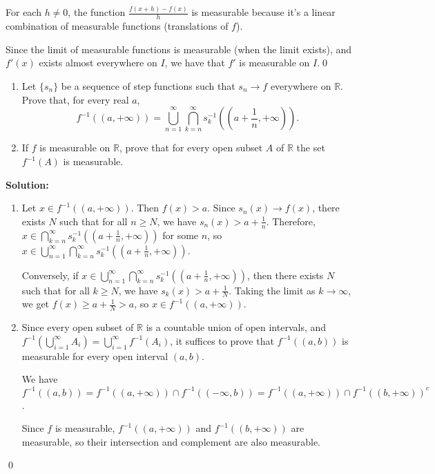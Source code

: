 For each $h \neq 0$, the function $\frac{f(x + h) - f(x)}{h}$ is measurable because it's a linear combination of measurable functions (translations of $f$).

Since the limit of measurable functions is measurable (when the limit exists), and $f'(x)$ exists almost everywhere on $I$, we have that $f'$ is measurable on $I$.\qed


\begin{problembox}
\begin{enumerate}[label=(\alph*)]
    \item Let $\{s_n\}$ be a sequence of step functions such that $s_n \to f$ everywhere on $\mathbb{R}$. Prove that, for every real $a$,
    \[f^{-1}((a, +\infty)) = \bigcup_{n=1}^\infty \bigcap_{k=n}^\infty s_k^{-1} \left( \left( a + \frac{1}{n}, +\infty \right) \right).\]
    \item If $f$ is measurable on $\mathbb{R}$, prove that for every open subset $A$ of $\mathbb{R}$ the set $f^{-1}(A)$ is measurable.
\end{enumerate}
\end{problembox}

\noindent\textbf{Solution:}
\begin{enumerate}[label=(\alph*)]
    \item Let $x \in f^{-1}((a, +\infty))$. Then $f(x) > a$. Since $s_n(x) \to f(x)$, there exists $N$ such that for all $n \geq N$, we have $s_n(x) > a + \frac{1}{n}$. Therefore, $x \in \bigcap_{k=n}^\infty s_k^{-1}((a + \frac{1}{n}, +\infty))$ for some $n$, so $x \in \bigcup_{n=1}^\infty \bigcap_{k=n}^\infty s_k^{-1}((a + \frac{1}{n}, +\infty))$.
    
    Conversely, if $x \in \bigcup_{n=1}^\infty \bigcap_{k=n}^\infty s_k^{-1}((a + \frac{1}{n}, +\infty))$, then there exists $N$ such that for all $k \geq N$, we have $s_k(x) > a + \frac{1}{N}$. Taking the limit as $k \to \infty$, we get $f(x) \geq a + \frac{1}{N} > a$, so $x \in f^{-1}((a, +\infty))$.
    
    \item Since every open subset of $\mathbb{R}$ is a countable union of open intervals, and $f^{-1}(\bigcup_{i=1}^{\infty} A_i) = \bigcup_{i=1}^{\infty} f^{-1}(A_i)$, it suffices to prove that $f^{-1}((a, b))$ is measurable for every open interval $(a, b)$.
    
    We have $f^{-1}((a, b)) = f^{-1}((a, +\infty)) \cap f^{-1}((-\infty, b)) = f^{-1}((a, +\infty)) \cap f^{-1}((b, +\infty))^c$.
    
    Since $f$ is measurable, $f^{-1}((a, +\infty))$ and $f^{-1}((b, +\infty))$ are measurable, so their intersection and complement are also measurable.
\end{enumerate}\qed


